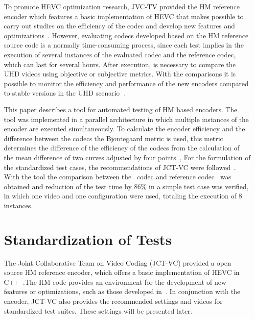 \documentclass{acm_proc_article-sp}
\begin{document}
To promote HEVC optimization research, JVC-TV provided the HM reference encoder which features a basic implementation of HEVC that makes possible  to carry out studies on the efficiency of the codec and develop new features and optimizations~\cite{itu:10}. However, evaluating codecs developed based on the HM reference source code is a normally time-consuming process, since each test implies in the execution of several instances of the evaluated codec and the reference codec, which can last for several hours. After execution, is necessary to compare the UHD videos using objective or subjective metrics. With the comparisons it is possible to monitor the efficiency and performance of the new encoders compared to stable versions in the UHD scenario~\cite{netflix:16}.

This paper describes a tool for automated testing of HM based encoders. The tool was implemented in a parallel architecture in which multiple instances of the encoder are executed simultaneously. To calculate the encoder efficiency and the difference between the codecs the Bjontegaard metric is used, this metric determines the difference of the efficiency of the codecs from the calculation of the mean difference of two curves adjusted by four points~\cite{Bjontegaard:01}, For the formulation of the standardized test cases, the recommendations of JCT-VC were followed~\cite{Bossen:15}. With the tool the comparison between the~\cite{oliveira:16} codec and reference codec~\cite{itu:10} was obtained and reduction of the test time by 86\% in a simple test case was verified, in which one video and one configuration were used, totaling the execution of 8 instances.
	
	
\section{Standardization of Tests}	



The Joint Collaborative Team on Video Coding (JCT-VC) provided a open source HM reference encoder, which offers a basic implementation of HEVC in C++~\cite{Bossen:15}.The HM code provides an environment for the development of new features or optimizations, such as those developed in~\cite{oliveira:16}\cite{Yoon:13}\cite{Correa:12}\cite{Weerakkody:14}. In conjunction with the encoder, JCT-VC also provides the recommended settings and videos for standardized test suites. These settings will be presented later.
\end{document}

